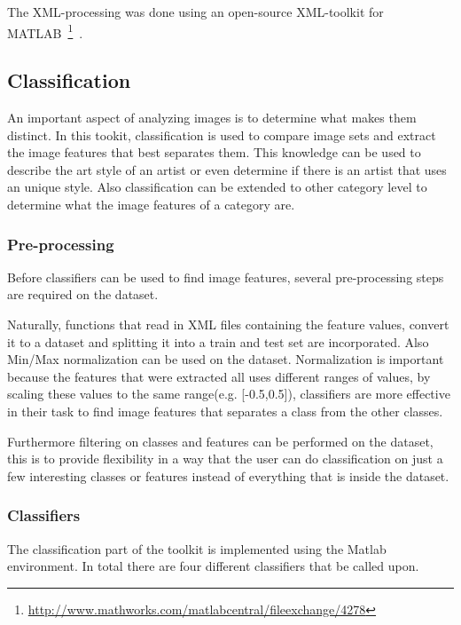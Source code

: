 The XML-processing was done using an open-source XML-toolkit for MATLAB~\footnote{\url{http://www.mathworks.com/matlabcentral/fileexchange/4278}}~\cite{geusebroek2005six}.



\subsection{Classification}
An important aspect of analyzing images is to determine what makes them distinct.
In this tookit, classification is used to compare image sets and extract the image features that best separates them.
This knowledge can be used to describe the art style of an artist or even determine if there is an artist that uses an unique style.
Also classification can be extended to other category level to determine what the image features of a category are.

\subsubsection{Pre-processing}
Before classifiers can be used to find image features, several pre-processing steps are required on the dataset.

Naturally, functions that read in XML files containing the feature values, convert it to a dataset and splitting it into a train and test set are incorporated.
Also Min/Max normalization can be used on the dataset.
Normalization is important because the features that were extracted all uses different ranges of values, by scaling these values to the same range(e.g. [-0.5,0.5]), classifiers are more effective in their task to find image features that separates a class from the other classes.

Furthermore filtering on classes and features can be performed on the dataset, this is to provide flexibility in a way that the user can do classification on just a few interesting classes or features instead of everything that is inside the dataset.

\subsubsection{Classifiers}
The classification part of the toolkit is implemented using the Matlab environment. In total there are four different classifiers that be called upon.

